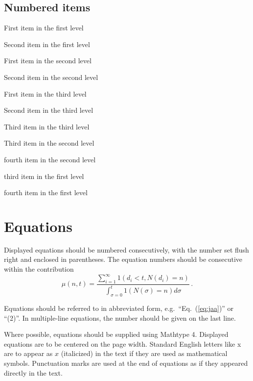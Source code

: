 \documentclass{ijcs_template}
\begin{document}
\subsection*{Numbered items}

\begin{arabiclist}
\item First item in the first level
\item Second item in the first level
\begin{alphlist}[(a)]
\item First item in the second level
\item Second item in the second level
\begin{romanlist}[iii.]
\item First item in the third level
\item Second item in the third level
\item Third item in the third level
\end{romanlist}
\item Third item in the second level
\item fourth item in the second level
\end{alphlist}
\item third item in the first level
\item fourth item in the first level
\end{arabiclist}

\section{Equations}
Displayed equations should be numbered consecutively, with the number
set flush right and enclosed in parentheses. The equation numbers
should be consecutive within the contribution
\begin{equation}
\mu(n, t) = \frac{\sum^\infty_{i=1} 1(d_i < t, N(d_i)
= n)}{\int^t_{\sigma=0} 1(N(\sigma) = n)d\sigma}\,.
\label{eq:jaa}
\end{equation}

Equations should be referred to in abbreviated form,
e.g.~``Eq.~(\ref{eq:jaa})'' or ``(2)''. In multiple-line equations,
the number should be given on the last line.

Where possible, equations should be supplied using Mathtype 4.
Displayed equations are to be centered on the page width.  Standard
English letters like x are to appear as $x$ (italicized) in the text
if they are used as mathematical symbols. Punctuation marks are used
at the end of equations as if they appeared directly in the text.
\end{document}
